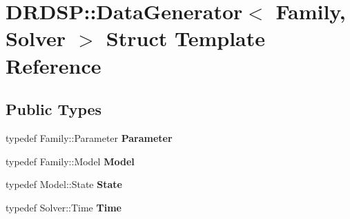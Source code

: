 \hypertarget{struct_d_r_d_s_p_1_1_data_generator}{\section{D\-R\-D\-S\-P\-:\-:Data\-Generator$<$ Family, Solver $>$ Struct Template Reference}
\label{struct_d_r_d_s_p_1_1_data_generator}
}
\subsection*{Public Types}
\begin{DoxyCompactItemize}
\item 
\hypertarget{struct_d_r_d_s_p_1_1_data_generator_ac2994c6f0175091fbcd8e931d21783f4}{typedef Family\-::\-Parameter {\bfseries Parameter}}\label{struct_d_r_d_s_p_1_1_data_generator_ac2994c6f0175091fbcd8e931d21783f4}

\item 
\hypertarget{struct_d_r_d_s_p_1_1_data_generator_a4049930241fd311c5e5822e55a1754fd}{typedef Family\-::\-Model {\bfseries Model}}\label{struct_d_r_d_s_p_1_1_data_generator_a4049930241fd311c5e5822e55a1754fd}

\item 
\hypertarget{struct_d_r_d_s_p_1_1_data_generator_a99095b39d8997f9eba9f2749b0ceedfb}{typedef Model\-::\-State {\bfseries State}}\label{struct_d_r_d_s_p_1_1_data_generator_a99095b39d8997f9eba9f2749b0ceedfb}

\item 
\hypertarget{struct_d_r_d_s_p_1_1_data_generator_a21ae5beadec290a4541c67338853cb5d}{typedef Solver\-::\-Time {\bfseries Time}}\label{struct_d_r_d_s_p_1_1_data_generator_a21ae5beadec290a4541c67338853cb5d}

\end{DoxyCompactItemize}
